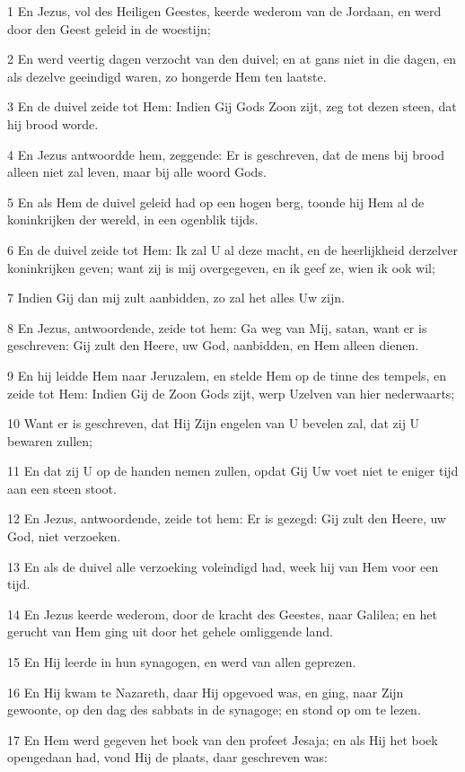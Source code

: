 \par 1 En Jezus, vol des Heiligen Geestes, keerde wederom van de Jordaan, en werd door den Geest geleid in de woestijn;
\par 2 En werd veertig dagen verzocht van den duivel; en at gans niet in die dagen, en als dezelve geeindigd waren, zo hongerde Hem ten laatste.
\par 3 En de duivel zeide tot Hem: Indien Gij Gods Zoon zijt, zeg tot dezen steen, dat hij brood worde.
\par 4 En Jezus antwoordde hem, zeggende: Er is geschreven, dat de mens bij brood alleen niet zal leven, maar bij alle woord Gods.
\par 5 En als Hem de duivel geleid had op een hogen berg, toonde hij Hem al de koninkrijken der wereld, in een ogenblik tijds.
\par 6 En de duivel zeide tot Hem: Ik zal U al deze macht, en de heerlijkheid derzelver koninkrijken geven; want zij is mij overgegeven, en ik geef ze, wien ik ook wil;
\par 7 Indien Gij dan mij zult aanbidden, zo zal het alles Uw zijn.
\par 8 En Jezus, antwoordende, zeide tot hem: Ga weg van Mij, satan, want er is geschreven: Gij zult den Heere, uw God, aanbidden, en Hem alleen dienen.
\par 9 En hij leidde Hem naar Jeruzalem, en stelde Hem op de tinne des tempels, en zeide tot Hem: Indien Gij de Zoon Gods zijt, werp Uzelven van hier nederwaarts;
\par 10 Want er is geschreven, dat Hij Zijn engelen van U bevelen zal, dat zij U bewaren zullen;
\par 11 En dat zij U op de handen nemen zullen, opdat Gij Uw voet niet te eniger tijd aan een steen stoot.
\par 12 En Jezus, antwoordende, zeide tot hem: Er is gezegd: Gij zult den Heere, uw God, niet verzoeken.
\par 13 En als de duivel alle verzoeking voleindigd had, week hij van Hem voor een tijd.
\par 14 En Jezus keerde wederom, door de kracht des Geestes, naar Galilea; en het gerucht van Hem ging uit door het gehele omliggende land.
\par 15 En Hij leerde in hun synagogen, en werd van allen geprezen.
\par 16 En Hij kwam te Nazareth, daar Hij opgevoed was, en ging, naar Zijn gewoonte, op den dag des sabbats in de synagoge; en stond op om te lezen.
\par 17 En Hem werd gegeven het boek van den profeet Jesaja; en als Hij het boek opengedaan had, vond Hij de plaats, daar geschreven was:
